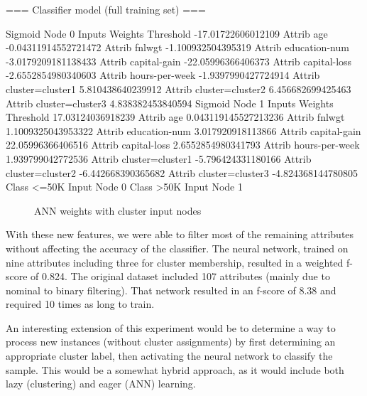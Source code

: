\documentclass{sig-alternate}
\begin{document}
\scriptsize
\begin{verbbox}
=== Classifier model (full training set) ===

Sigmoid Node 0
    Inputs    Weights
    Threshold    -17.01722606012109
    Attrib age    -0.04311914552721472
    Attrib fnlwgt    -1.100932504395319
    Attrib education-num    -3.0179209181138433
    Attrib capital-gain    -22.05996366406373
    Attrib capital-loss    -2.6552854980340603
    Attrib hours-per-week    -1.9397990427724914
    Attrib cluster=cluster1    5.810438640239912
    Attrib cluster=cluster2    6.456682699425463
    Attrib cluster=cluster3    4.838382453840594
Sigmoid Node 1
    Inputs    Weights
    Threshold    17.03124036918239
    Attrib age    0.043119145527213236
    Attrib fnlwgt    1.1009325043953322
    Attrib education-num    3.017920918113866
    Attrib capital-gain    22.05996366406516
    Attrib capital-loss    2.6552854980341793
    Attrib hours-per-week    1.939799042772536
    Attrib cluster=cluster1    -5.796424331180166
    Attrib cluster=cluster2    -6.442668390365682
    Attrib cluster=cluster3    -4.824368144780805
Class  <=50K
    Input
    Node 0
Class  >50K
    Input
    Node 1
\end{verbbox}
\normalsize

\begin{figure}[!htbp]
    \centering
    \theverbbox
    \caption{ANN weights with cluster input nodes\label{ann-cluster-weights}}
\end{figure}

With these new features, we were able to filter most of the remaining attributes without affecting the accuracy of the classifier. The neural network, trained on nine attributes including three for cluster membership, resulted in a weighted f-score of 0.824. The original dataset included 107 attributes (mainly due to nominal to binary filtering). That network resulted in an f-score of 8.38 and required 10 times as long to train.

An interesting extension of this experiment would be to determine a way to process new instances (without cluster assignments) by first determining an appropriate cluster label, then activating the neural network to classify the sample. This would be a somewhat hybrid approach, as it would include both lazy (clustering) and eager (ANN) learning.


\end{document}
